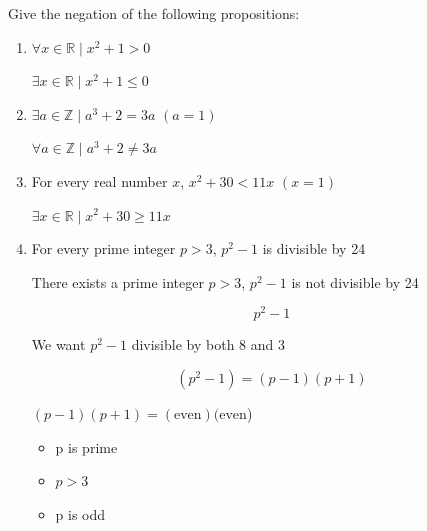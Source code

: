 \documentclass[../../Main.tex]{subfiles}
\begin{document}
\begin{example}
    Give the negation of the following propositions:

    \begin{enumerate}
        \item
            $\forall x \in \mathbb{R} \mid x^2 + 1 > 0$ \TRUE
            
            \begin{solution}
                $\exists x \in \mathbb{R} \mid x^2 + 1 \leq 0$ \FALSE
            \end{solution}

        \item
            $\exists a \in \mathbb{Z} \mid a^3 + 2 = 3a$ \TRUE $(a = 1)$

            \begin{solution}
                $\forall a \in \mathbb{Z} \mid a^3 + 2 \not = 3a$ \FALSE
            \end{solution}

        \item 
            For every real number $x$, $x^2 + 30 < 11x$ \FALSE $(x=1)$

            \begin{solution}
                $\exists x \in \mathbb{R} \mid x^2 + 30 \geq 11x$ \TRUE
            \end{solution}

        \item 
            For every prime integer $p > 3$, $p^2 - 1$ is divisible by 24 \TRUE

            \begin{solution}
                There exists a prime integer $p > 3$, $p^2 - 1$ is not divisible by 24 \FALSE
            \end{solution}

            \begin{work}
                $$p^2 - 1$$

                \begin{center}
                    We want $p^2 -1$ divisible by both 8 and 3
                \end{center}

                $$(p^2 -1 ) = (p -1)(p + 1)$$
                
                \begin{center}
                    $(p - 1)(p + 1) = (\text{even})(\text{even}$)
                \end{center}

                \begin{itemize}
                    \item p is prime
                    \item $p > 3$
                    \item p is odd
                \end{itemize}
                
            \end{work}
        
    \end{enumerate}
\end{example}
\end{document}

